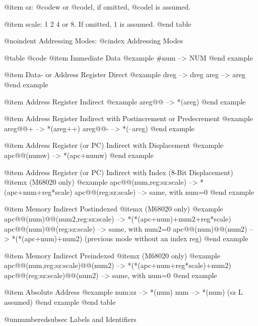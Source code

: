 {{{{@item sz:
@code{w} or @code{l}, if omitted, @code{l} is  assumed.

@item scale:
1 2 4 or 8. If omitted, 1 is assumed.
@end table

@noindent
Addressing Modes:
@cindex Addressing Modes

@table @code
@item Immediate Data
@example 
#num                          --> NUM
@end example

@item Data- or Address Register Direct
@example
dreg                          --> dreg
areg                          --> areg
@end example

@item Address Register Indirect
@example
areg@@                         --> *(areg)
@end example

@item Address Register Indirect with Postincrement or Predecrement
@example
areg@@+                        --> *(areg++)
areg@@-                        --> *(--areg)
@end example

@item Address Register (or PC) Indirect with Displacement
@example
apc@@(numw)                    --> *(apc+numw) 
@end example

@item Address Register (or PC) Indirect with Index (8-Bit Displacement)
@itemx (M68020 only)
@example
apc@@(num,reg:sz:scale)        --> *(apc+num+reg*scale)
apc@@(reg:sz:scale)            --> same, with num=0
@end example

@item Memory Indirect Postindexed
@itemx (M68020 only)
@example
apc@@(num)@@(num2,reg:sz:scale) --> *(*(apc+num)+num2+reg*scale)
apc@@(num)@@(reg:sz:scale)      --> same, with num2=0
apc@@(num)@@(num2)              --> *(*(apc+num)+num2)
                                 (previous mode without an index reg)
@end example

@item Memory Indirect Preindexed
@itemx (M68020 only)
@example
apc@@(num,reg:sz:scale)@@(num2) --> *(*(apc+num+reg*scale)+num2)
apc@@(reg:sz:scale)@@(num2)     --> same, with num=0
@end example

@item Absolute Address
@example
num:sz                        --> *(num)
num                           --> *(num) (sz L assumed)
@end example
@end table

@unnumberedsubsec Labels and Identifiers

}}}}
